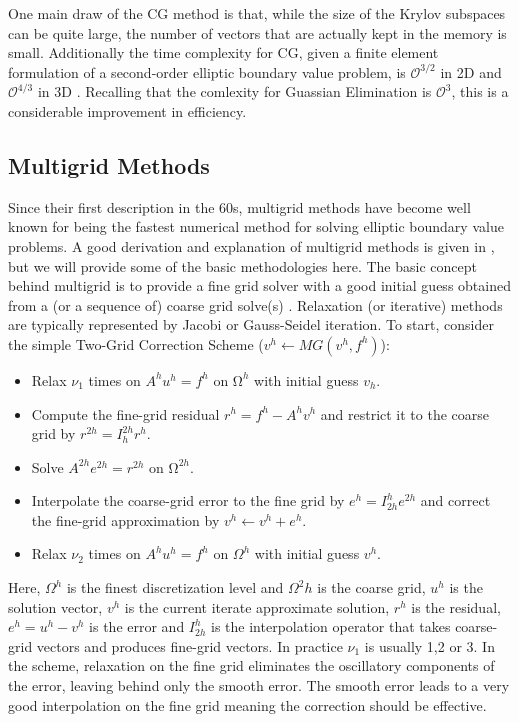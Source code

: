 \documentclass[]{article}
\theoremstyle{definition}
\begin{document}
One main draw of the CG method is that, while the size of the Krylov subspaces can be quite large, the number of vectors that are actually kept in the memory is small.  Additionally the time complexity for CG, given a finite element formulation of a second-order elliptic boundary value problem, is $\mathcal{O}^{3/2}$ in 2D and $\mathcal{O}^{4/3}$ in 3D \cite{Shewchuk1994}. Recalling that the comlexity for Guassian Elimination is $\mathcal{O}^{3}$, this is a considerable improvement in efficiency.

\subsection{Multigrid Methods}

Since their first description in the 60s, multigrid methods have become well known for being the fastest numerical method for solving elliptic boundary value problems.  A good derivation and explanation of multigrid methods is given in \cite{Briggs2000}, but we will provide some of the basic methodologies here. The basic concept behind multigrid is to provide a fine grid solver with a good initial guess obtained from a (or a sequence of) coarse grid solve(s) \cite{Briggs2000}.  Relaxation (or iterative) methods are typically represented by Jacobi or Gauss-Seidel iteration.  To start, consider the simple Two-Grid Correction Scheme ($v^h \leftarrow MG(v^h, f^h)$):
\begin{itemize}
\item Relax $\nu_1$ times on $A^h u^h = f^h$ on $Ω^h$ with initial guess $v_h$.
\item Compute the fine-grid residual $r^h = f^h - A^h v^h$ and restrict it to the coarse grid by $r^{2h} = I^{2h}_h r^h$.
\item Solve $A^{2h}e^{2h} = r^{2h}$ on $Ω^{2h}$.
\item Interpolate the coarse-grid error to the fine grid by $e^h = I^h_{2h} e^{2h}$ and correct the fine-grid approximation by $v^h \leftarrow v^h + e^h$.
\item Relax $\nu_2$ times on $A^h u^h = f^h$ on $\Omega^h$ with initial guess $v^h$.
\end{itemize}
Here, $\Omega^h$ is the finest discretization level and $\Omega^2h$ is the coarse grid, $u^h$ is the solution vector, $v^h$ is the current iterate approximate solution, $r^h$ is the residual, $e^h = u^h - v^h$ is the error and $I^h_{2h}$ is the interpolation operator that takes coarse-grid vectors and produces fine-grid vectors.  In practice $\nu_1$ is usually 1,2 or 3.  In the scheme, relaxation on the fine grid eliminates the oscillatory components of the error, leaving behind only the smooth error.  The smooth error leads to a very good interpolation on the fine grid meaning the correction should be effective. 
\end{document}
